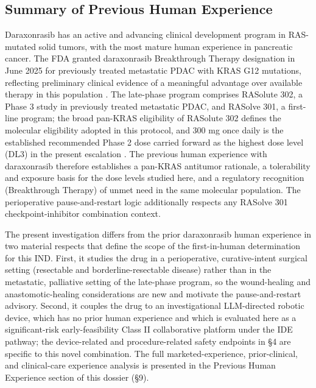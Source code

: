 \subsection{Summary of Previous Human Experience}

Daraxonrasib has an active and advancing clinical development program in
RAS-mutated solid tumors, with the most mature human experience in pancreatic
cancer. The FDA granted daraxonrasib Breakthrough Therapy designation in June 2025
for previously treated metastatic PDAC with KRAS G12 mutations, reflecting
preliminary clinical evidence of a meaningful advantage over available therapy in
this population \cite{daraxwhipple, onpremwhippl}. The late-phase program comprises
RASolute 302, a Phase 3 study in previously treated metastatic PDAC, and RASolve
301, a first-line program; the broad pan-KRAS eligibility of RASolute 302 defines
the molecular eligibility adopted in this protocol, and 300 mg once daily is the
established recommended Phase 2 dose carried forward as the highest dose level (DL3)
in the present escalation \cite{daraxwhipple}. The previous human experience with
daraxonrasib therefore establishes a pan-KRAS antitumor rationale, a tolerability
and exposure basis for the dose levels studied here, and a regulatory recognition
(Breakthrough Therapy) of unmet need in the same molecular population. The
perioperative pause-and-restart logic additionally respects any RASolve 301
checkpoint-inhibitor combination context.

The present investigation differs from the prior daraxonrasib human experience in
two material respects that define the scope of the first-in-human determination for
this IND. First, it studies the drug in a perioperative, curative-intent surgical
setting (resectable and borderline-resectable disease) rather than in the
metastatic, palliative setting of the late-phase program, so the wound-healing and
anastomotic-healing considerations are new and motivate the pause-and-restart
advisory. Second, it couples the drug to an investigational LLM-directed robotic
device, which has no prior human experience and which is evaluated here as a
significant-risk early-feasibility Class II collaborative platform under the IDE
pathway; the device-related and procedure-related safety endpoints in \S 4 are
specific to this novel combination. The full marketed-experience, prior-clinical,
and clinical-care experience analysis is presented in the Previous Human Experience
section of this dossier (\S 9).

